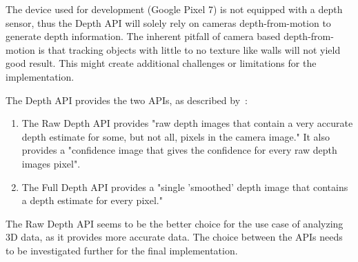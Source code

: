 The device used for development (Google Pixel 7) is not equipped with a depth sensor, thus the Depth API will solely rely on cameras depth-from-motion to generate depth information.
The inherent pitfall of camera based depth-from-motion is that tracking objects with little to no texture like walls will not yield good result.
This might create additional challenges or limitations for the implementation.

The Depth API provides the two APIs, as described by~\cite{arcore-doc-raw-depth}:
\begin{enumerate}
    \item The Raw Depth API provides "raw depth images that contain a very accurate depth estimate for some, but not all, pixels in the camera image."
    It also provides a "confidence image that gives the confidence for every raw depth images pixel".
    \item The Full Depth API provides a "single 'smoothed' depth image that contains a depth estimate for every pixel."
\end{enumerate}

The Raw Depth API seems to be the better choice for the use case of analyzing 3D data, as it provides more accurate data.
The choice between the APIs needs to be investigated further for the final implementation.


